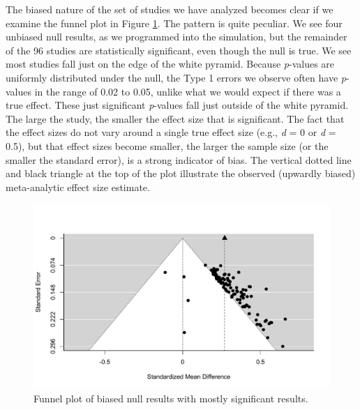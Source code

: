\documentclass[
  oneside]{book}
\begin{document}
The biased nature of the set of studies we have analyzed becomes clear if we examine the funnel plot in Figure \ref{fig:funnel2}. The pattern is quite peculiar. We see four unbiased null results, as we programmed into the simulation, but the remainder of the 96 studies are statistically significant, even though the null is true. We see most studies fall just on the edge of the white pyramid. Because \emph{p}-values are uniformly distributed under the null, the Type 1 errors we observe often have \emph{p}-values in the range of 0.02 to 0.05, unlike what we would expect if there was a true effect. These just significant \emph{p}-values fall just outside of the white pyramid. The large the study, the smaller the effect size that is significant. The fact that the effect sizes do not vary around a single true effect size (e.g., \emph{d} = 0 or \emph{d} = 0.5), but that effect sizes become smaller, the larger the sample size (or the smaller the standard error), is a strong indicator of bias. The vertical dotted line and black triangle at the top of the plot illustrate the observed (upwardly biased) meta-analytic effect size estimate.



\begin{figure}

{\centering \includegraphics[width=1\linewidth]{12-bias_files/figure-latex/funnel2-1} 

}

\caption{Funnel plot of biased null results with mostly significant results.}\label{fig:funnel2}
\end{figure}
\end{document}

